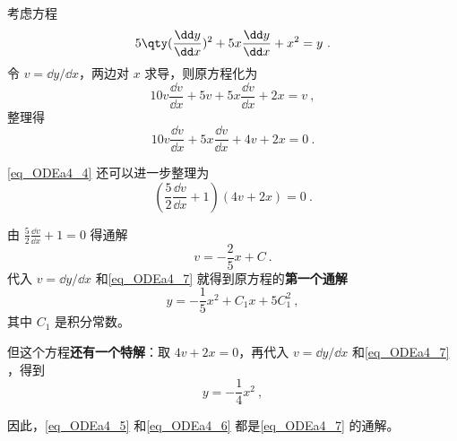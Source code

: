 \begin{example}{}\label{ex_ODEa4_1}
考虑方程
\begin{equation}\label{eq_ODEa4_7}
5\qty(\frac{\dd y}{\dd x})^2+5x\frac{\dd y}{\dd x}+x^2=y~.
\end{equation}
令 $v=\dd y/\dd x$，两边对 $x$ 求导，则原方程化为
\begin{equation}\label{eq_ODEa4_8}
10v\frac{\dd v}{\dd x}+5v+5x\frac{\dd v}{\dd x}+2x=v~,
\end{equation}
整理得
\begin{equation}\label{eq_ODEa4_4}
10v\frac{\dd v}{\dd x}+5x\frac{\dd v}{\dd x}+4v+2x=0~.
\end{equation}

\autoref{eq_ODEa4_4} 还可以进一步整理为
\begin{equation}
(\frac{5}{2}\frac{\dd v}{\dd x}+1)(4v+2x)=0~.
\end{equation}

由 $\frac{5}{2}\frac{\dd v}{\dd x}+1=0$ 得通解
\begin{equation}\label{eq_ODEa4_9}
v=-\frac{2}{5}x+C~.
\end{equation}
代入 $v=\dd y/\dd x$ 和\autoref{eq_ODEa4_7} 就得到原方程的\textbf{第一个通解}
\begin{equation}\label{eq_ODEa4_5}
y=-\frac{1}{5}x^2+C_1x+5C_1^2~,
\end{equation}
其中 $C_1$ 是积分常数。

但这个方程\textbf{还有一个特解}：取 $4v+2x=0$，再代入 $v=\dd y/\dd x$ 和\autoref{eq_ODEa4_7} ，得到
\begin{equation}\label{eq_ODEa4_6}
y=-\frac{1}{4}x^2~,
\end{equation}

因此，\autoref{eq_ODEa4_5} 和\autoref{eq_ODEa4_6} 都是\autoref{eq_ODEa4_7} 的通解。




\end{example}

